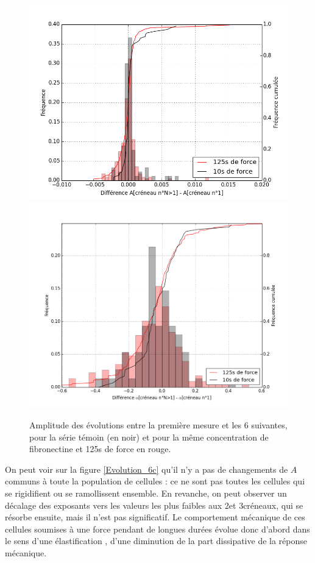 \documentclass{report}
\begin{document}
\begin{figure}
\includegraphics[scale=0.3]{Figures/A_diff.png} 
\includegraphics[scale=0.3]{Figures/E_diff.png}
\caption{Amplitude des évolutions entre la première mesure et les 6 suivantes, pour la série  témoin (en noir) et pour la même concentration de fibronectine et 125s de force en rouge.}
\label{Diff}

 
\end{figure}
On peut voir sur la figure \ref{Evolution_6c} qu'il n'y a pas de changements de $A$ communs à toute la population de cellules : ce ne sont pas toutes les cellules qui se rigidifient ou se ramollissent ensemble. 
En revanche, on peut observer un décalage des exposants vers les valeurs les plus faibles aux 2\ieme  et 3\ieme créneaux, qui se résorbe ensuite, mais il n'est pas significatif. 
Le comportement mécanique de ces cellules soumises à une force pendant de longues durées évolue donc d'abord dans le sens d'une \og élastification \fg , d'une diminution de la part dissipative de la réponse mécanique. 
\end{document}
